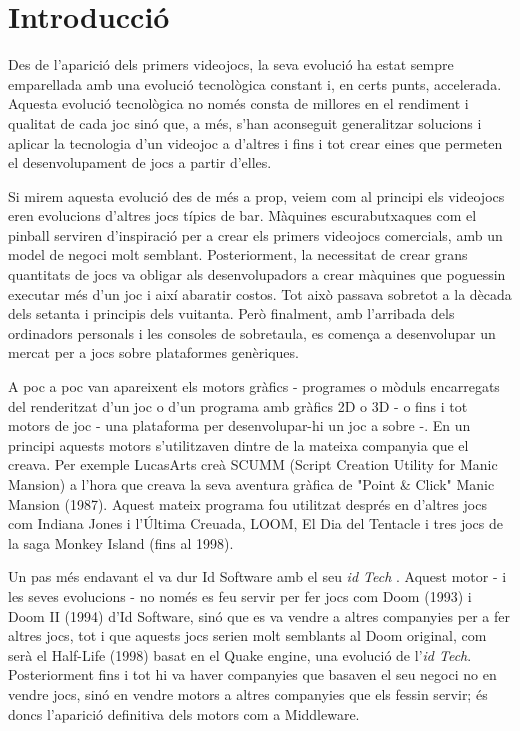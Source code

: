 \chapter{Introducció}

Des de l'aparició dels primers videojocs, la seva evolució ha estat sempre emparellada amb una evolució tecnològica constant i, en certs punts, accelerada. Aquesta evolució tecnològica no només consta de millores en el rendiment i qualitat de cada joc sinó que, a més, s’han aconseguit generalitzar solucions i aplicar la tecnologia d’un videojoc a d'altres i fins i tot crear eines que permeten el desenvolupament de jocs a partir d'elles.

Si mirem aquesta evolució des de més a prop, veiem com al principi els videojocs eren evolucions d'altres jocs típics de bar. Màquines escurabutxaques com el pinball serviren d'inspiració per a crear els primers videojocs comercials, amb un model de negoci molt semblant. Posteriorment, la necessitat de crear grans quantitats de jocs va obligar als desenvolupadors a crear màquines que poguessin executar més d'un joc i així abaratir costos. Tot això passava sobretot a la dècada dels setanta i principis dels vuitanta. Però finalment, amb l'arribada dels ordinadors personals i les consoles de sobretaula, es comença a desenvolupar un mercat per a jocs sobre plataformes genèriques.

A poc a poc van apareixent els motors gràfics - programes o mòduls encarregats del renderitzat d'un joc o d'un programa amb gràfics 2D o 3D - o fins i tot motors de joc - una plataforma per desenvolupar-hi un joc a sobre -. En un principi aquests motors s'utilitzaven dintre de la mateixa companyia que el creava. Per exemple LucasArts creà {SCUMM} ({Script Creation Utility for Manic Mansion}) \citep{WikiScumm} a l'hora que creava la seva aventura gràfica de "Point \& Click" Manic Mansion (1987). Aquest mateix programa fou utilitzat després en d'altres jocs com Indiana Jones i l'Última Creuada, LOOM, El Dia del Tentacle i tres jocs de la saga Monkey Island (fins al 1998).

Un pas més endavant el va dur Id Software amb el seu {\em id Tech}  \citep{WikiScumm}. Aquest motor - i les seves evolucions - no només es feu servir per fer jocs com Doom (1993) i Doom II (1994) d'Id Software, sinó que es va vendre a altres companyies per a fer altres jocs, tot i que aquests jocs serien molt semblants al Doom original, com serà el Half-Life (1998) basat en el Quake engine, una evolució de l'{\em id Tech}. Posteriorment fins i tot hi va haver companyies que basaven el seu negoci no en vendre jocs, sinó en vendre motors a altres companyies que els fessin servir; és doncs l'aparició definitiva dels motors com a Middleware.

